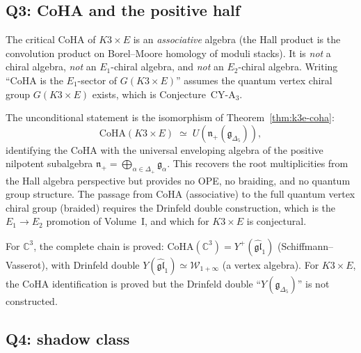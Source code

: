 \subsection{Q3: CoHA and the positive half}
\label{subsec:k3e-bkm-q3}

\begin{warning}
\label{warn:bkm-coha-not-chiral}
The critical CoHA of $K3 \times E$ is an \emph{associative} algebra (the Hall product is the convolution product on Borel--Moore homology of moduli stacks). It is \emph{not} a chiral algebra, \emph{not} an $E_1$-chiral algebra, and \emph{not} an $E_2$-chiral algebra. Writing ``CoHA is the $E_1$-sector of $G(K3 \times E)$'' assumes the quantum vertex chiral group $G(K3 \times E)$ exists, which is Conjecture~CY-A$_3$.
\end{warning}

The unconditional statement is the isomorphism of Theorem~\ref{thm:k3e-coha}:
\[
 \mathrm{CoHA}(K3 \times E) \;\simeq\; U(\mathfrak{n}_+(\mathfrak{g}_{\Delta_5})),
\]
identifying the CoHA with the universal enveloping algebra of the positive nilpotent subalgebra $\mathfrak{n}_+ = \bigoplus_{\alpha \in \Delta_+} \mathfrak{g}_\alpha$. This recovers the root multiplicities from the Hall algebra perspective but provides no OPE, no braiding, and no quantum group structure. The passage from CoHA (associative) to the full quantum vertex chiral group (braided) requires the Drinfeld double construction, which is the $E_1 \to E_2$ promotion of Volume~I, and which for $K3 \times E$ is conjectural.

\begin{remark}
\label{rem:bkm-c3-comparison}
For $\mathbb{C}^3$, the complete chain is proved: $\mathrm{CoHA}(\mathbb{C}^3) = Y^+(\widehat{\mathfrak{gl}}_1)$ (Schiffmann--Vasserot), with Drinfeld double $Y(\widehat{\mathfrak{gl}}_1) \simeq \mathcal{W}_{1+\infty}$ (a vertex algebra). For $K3 \times E$, the CoHA identification is proved but the Drinfeld double ``$Y(\mathfrak{g}_{\Delta_5})$'' is not constructed.
\end{remark}

\subsection{Q4: shadow class}
\label{subsec:k3e-bkm-q4}


